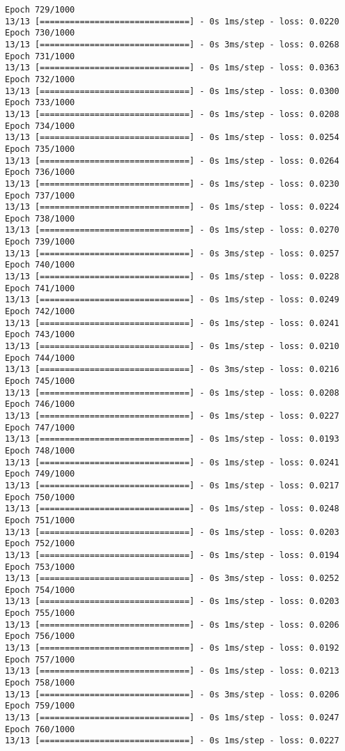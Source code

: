 \documentclass[11pt]{article}
\begin{document}
\begin{Verbatim}[commandchars=\\\{\}]
Epoch 729/1000
13/13 [==============================] - 0s 1ms/step - loss: 0.0220
Epoch 730/1000
13/13 [==============================] - 0s 3ms/step - loss: 0.0268
Epoch 731/1000
13/13 [==============================] - 0s 1ms/step - loss: 0.0363
Epoch 732/1000
13/13 [==============================] - 0s 1ms/step - loss: 0.0300
Epoch 733/1000
13/13 [==============================] - 0s 1ms/step - loss: 0.0208
Epoch 734/1000
13/13 [==============================] - 0s 1ms/step - loss: 0.0254
Epoch 735/1000
13/13 [==============================] - 0s 1ms/step - loss: 0.0264
Epoch 736/1000
13/13 [==============================] - 0s 1ms/step - loss: 0.0230
Epoch 737/1000
13/13 [==============================] - 0s 1ms/step - loss: 0.0224
Epoch 738/1000
13/13 [==============================] - 0s 1ms/step - loss: 0.0270
Epoch 739/1000
13/13 [==============================] - 0s 3ms/step - loss: 0.0257
Epoch 740/1000
13/13 [==============================] - 0s 1ms/step - loss: 0.0228
Epoch 741/1000
13/13 [==============================] - 0s 1ms/step - loss: 0.0249
Epoch 742/1000
13/13 [==============================] - 0s 1ms/step - loss: 0.0241
Epoch 743/1000
13/13 [==============================] - 0s 1ms/step - loss: 0.0210
Epoch 744/1000
13/13 [==============================] - 0s 3ms/step - loss: 0.0216
Epoch 745/1000
13/13 [==============================] - 0s 1ms/step - loss: 0.0208
Epoch 746/1000
13/13 [==============================] - 0s 1ms/step - loss: 0.0227
Epoch 747/1000
13/13 [==============================] - 0s 1ms/step - loss: 0.0193
Epoch 748/1000
13/13 [==============================] - 0s 1ms/step - loss: 0.0241
Epoch 749/1000
13/13 [==============================] - 0s 1ms/step - loss: 0.0217
Epoch 750/1000
13/13 [==============================] - 0s 1ms/step - loss: 0.0248
Epoch 751/1000
13/13 [==============================] - 0s 1ms/step - loss: 0.0203
Epoch 752/1000
13/13 [==============================] - 0s 1ms/step - loss: 0.0194
Epoch 753/1000
13/13 [==============================] - 0s 3ms/step - loss: 0.0252
Epoch 754/1000
13/13 [==============================] - 0s 1ms/step - loss: 0.0203
Epoch 755/1000
13/13 [==============================] - 0s 1ms/step - loss: 0.0206
Epoch 756/1000
13/13 [==============================] - 0s 1ms/step - loss: 0.0192
Epoch 757/1000
13/13 [==============================] - 0s 1ms/step - loss: 0.0213
Epoch 758/1000
13/13 [==============================] - 0s 3ms/step - loss: 0.0206
Epoch 759/1000
13/13 [==============================] - 0s 1ms/step - loss: 0.0247
Epoch 760/1000
13/13 [==============================] - 0s 1ms/step - loss: 0.0227

\end{Verbatim}
\end{document}
